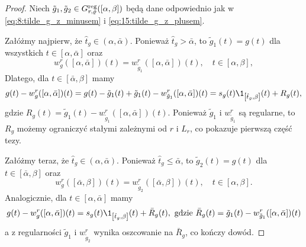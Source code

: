 \documentclass[oik, pdftex, man]{mgrwms}
\begin{document}
    \begin{proof}
        Niech $\tilde{g}_{1}, \tilde{g}_{2} \in G_{r, \varrho}^{\mathrm{reg}}([\alpha, \beta])$ będą dane odpowiednio jak w \eqref{eq:8:tilde_g_z_minusem} i \eqref{eq:15:tilde_g_z_plusem}.

        Załóżmy najpierw, że $\hat{t}_{g} \in (\alpha,\bar{\alpha})$.
        Ponieważ $\hat{t}_{g}>\bar{\alpha}$, to $\tilde{g}_{1}(t)=g(t)$ dla wszystkich $t \in[\alpha, \bar{\alpha}]$ oraz
        \begin{equation*}
            w_{g}^{r}([\alpha, \bar{\alpha}])(t)=w_{\tilde{g}_{1}}^{r}([\alpha, \bar{\alpha}])(t), \quad t \in[\alpha, \beta],
        \end{equation*}
        Dlatego, dla $t \in[\bar{\alpha}, \beta]$ mamy
        \begin{equation}
            g(t)-w_{g}^{r}([\alpha, \bar{\alpha}])(t)=g(t)-\tilde{g}_{1}(t)+\tilde{g}_{1}(t)-w_{\tilde{g}_{1}}^{r}([\alpha, \bar{\alpha}])(t)=s_{g}(t) \1_{\left[\hat{t}_{g}, \beta\right]}(t)+R_{g}(t),
        \end{equation}
        gdzie $R_{g}(t)=\tilde{g}_{1}(t)-w_{\tilde{g}_{1}}^{r}([\alpha, \bar{\alpha}])(t)$. Ponieważ $\tilde{g}_{1}$ i $w_{\tilde{g}_{1}}^{r}$ są regularne, to $R_{g}$ możemy ograniczyć stałymi zależnymi  od $r$ i $L_{r}$, co pokazuje pierwszą część tezy.

        Załóżmy teraz, że $\hat{t}_{g} \in (\alpha,\bar{\alpha})$.
        Ponieważ $\hat{t}_{g} \leq \bar{\alpha}$, to $\tilde{g}_{2}(t)=g(t)$ dla $t \in[\bar{\alpha}, \beta]$ oraz
        \begin{equation*}
            w_{g}^{r}([\bar{\alpha}, \beta])(t)=w_{\tilde{g}_{2}}^{r}([\bar{\alpha}, \beta])(t), \quad t \in[\alpha, \beta].
        \end{equation*}
        Analogicznie, dla $t \in [\alpha, \bar{\alpha}]$ mamy
        \begin{equation}
            g(t)-w_{g}^{r}([\alpha, \bar{\alpha}])(t)=s_{g}(t) \1_{\left[\hat{t}_{g}, \beta\right]}(t)+\bar{R}_{g}(t), \text{ gdzie } \bar{R}_{g}(t)=\tilde{g}_{1}(t)-w_{\tilde{g}_{1}}^{r}([\alpha, \bar{\alpha}])(t)
        \end{equation}
        a z regularności $\tilde{g}_{1}$ i $w_{\tilde{g}_{2}}^{r}$ wynika oszcowanie na $\bar{R}_{g}$, co kończy dowód.
    \end{proof}
\end{document}
